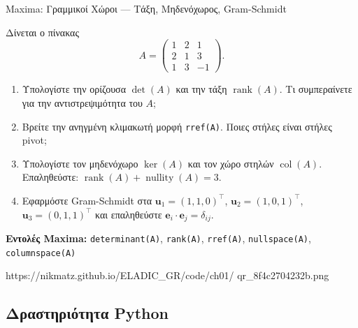 %
%
%

\casactivbox%
  {Maxima: Γραμμικοί Χώροι — Τάξη, Μηδενόχωρος, Gram-Schmidt}%
  {%
    \label{cas:ch1_vector_spaces}
    Δίνεται ο πίνακας
    \[
      A = \begin{pmatrix} 1 & 2 & 1 \\ 2 & 1 & 3 \\ 1 & 3 & -1 \end{pmatrix}.
    \]
    \begin{enumerate}[label=(\alph*),itemsep=2pt]
      \item Υπολογίστε την ορίζουσα $\det(A)$ και την τάξη $\operatorname{rank}(A)$.
        Τι συμπεραίνετε για την αντιστρεψιμότητα του $A$;
      \item Βρείτε την ανηγμένη κλιμακωτή μορφή \texttt{rref(A)}.
        Ποιες στήλες είναι στήλες pivot;
      \item Υπολογίστε τον μηδενόχωρο $\ker(A)$ και τον χώρο στηλών
        $\operatorname{col}(A)$. Επαληθεύστε:
        $\operatorname{rank}(A) + \operatorname{nullity}(A) = 3$.
      \item Εφαρμόστε Gram-Schmidt στα $\mathbf{u}_1=(1,1,0)^\top$,
        $\mathbf{u}_2=(1,0,1)^\top$, $\mathbf{u}_3=(0,1,1)^\top$ και
        επαληθεύστε $\mathbf{e}_i \cdot \mathbf{e}_j = \delta_{ij}$.
    \end{enumerate}
    \smallskip
    \textbf{Εντολές Maxima:}
    \texttt{determinant(A)}, \texttt{rank(A)}, \texttt{rref(A)},
    \texttt{nullspace(A)}, \texttt{columnspace(A)}
  }%
  {https://nikmatz.github.io/ELADIC_GR/code/ch01/}%
  {qr_8f4c2704232b.png}

\subsection*{Δραστηριότητα Python}

